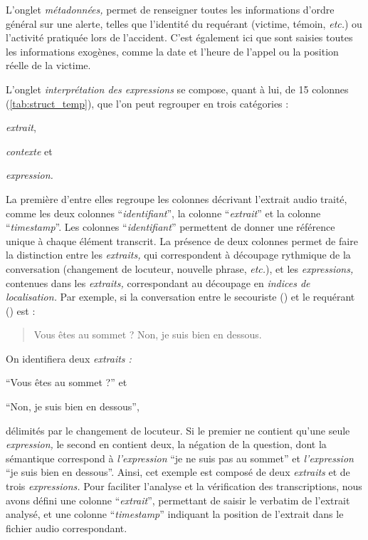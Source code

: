 L'onglet \emph{métadonnées,} permet de renseigner toutes les
informations d'ordre général sur une alerte, telles que l'identité du
requérant (victime, témoin, \emph{etc.}) ou l’activité pratiquée lors
de l'accident. C'est également ici que sont saisies toutes les
informations exogènes, comme la date et l'heure de l'appel ou la
position réelle de la victime.

L'onglet \emph{interprétation
  des expressions} se compose, quant à lui, de 15 colonnes
(\autoref{tab:struct_temp}), que l'on peut regrouper en trois
catégories :
%
\begin{enumerate*}[label=(\alph*)]
\item \emph{extrait},
\item \emph{contexte} et
\item \emph{expression.}
\end{enumerate*}

La première d'entre elles regroupe les colonnes décrivant l'extrait
audio traité, comme les deux colonnes \enquote{\emph{identifiant}}, la
colonne \enquote{\emph{extrait}} et la colonne
\enquote{\emph{timestamp}}. Les colonnes \enquote{\emph{identifiant}}
permettent de donner une référence unique à chaque élément
transcrit. La présence de deux colonnes permet de faire la distinction
entre les \emph{extraits,} qui correspondent à découpage rythmique de
la conversation (changement de locuteur, nouvelle phrase,
\emph{etc.}), et les \emph{expressions,} contenues dans les
\emph{extraits,} correspondant au découpage en \emph{indices de
  localisation.} Par exemple, si la conversation entre le secouriste
() et le requérant () est :
%
\begin{quote}
  \begin{dialogue}
    \Sec Vous êtes au sommet ?
    \Req Non, je suis bien en dessous.
  \end{dialogue}
\end{quote}
%
On identifiera deux \emph{extraits :}
%
\begin{enumerate*}[label=(\alph*)]
\item \enquote{Vous êtes au sommet ?} et
\item \enquote{Non, je suis bien en dessous},
\end{enumerate*}
%
délimités par le changement de locuteur. Si le premier ne contient
qu'une seule \emph{expression,} le second en contient deux, la
négation de la question, dont la sémantique correspond à
\emph{l'expression} \enquote{je ne suis pas au sommet} et
\emph{l'expression} \enquote{je suis bien en dessous}. Ainsi, cet
exemple est composé de deux \emph{extraits} et de trois
\emph{expressions.} Pour faciliter l'analyse et la vérification des
transcriptions, nous avons défini une colonne
\enquote{\emph{extrait}}, permettant de saisir le verbatim de
l'extrait analysé, et une colonne \enquote{\emph{timestamp}} indiquant
la position de l'extrait dans le fichier audio correspondant.

